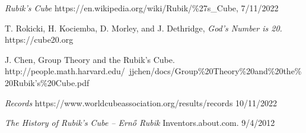 \documentclass[a4paper]{article}
\begin{document}
\appendix

\begin{thebibliography}{9}

 \emph{Rubik's Cube} https://en.wikipedia.org/wiki/Rubik/\%27s\_Cube, 7/11/2022

 T. Rokicki, H. Kociemba, D. Morley, and J. Dethridge, \emph{God’s Number is 20.} https://cube20.org

 J. Chen, Group Theory and the Rubik’s Cube. http://people.math.harvard.edu/~jjchen/docs/Group\%20Theory\%20and\%20the\%20Rubik’s\%20Cube.pdf

 \emph{Records} https://www.worldcubeassociation.org/results/records 10/11/2022

\bibitem{} \emph{The History of Rubik's Cube – Ernő Rubik} Inventors.about.com. 9/4/2012

\end{thebibliography}

\appendix
\end{document}
